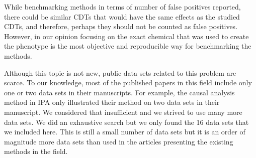 
While benchmarking methods in terms of number of false positives reported, there could be similar CDTs that would have the same effects as the studied CDTs, and therefore, perhaps they should not be counted as false positives. However, in our opinion focusing on the exact chemical that was used to create the phenotype is the most objective and reproducible way for benchmarking the methods.


Although this topic is not new, public data sets related to this problem are scarce. To our knowledge, most of the published papers in this field include only one or two data sets in their manuscripts. For example, the causal analysis method in IPA only illustrated their method on two data sets in their manuscript. We considered that insufficient and we strived to use many more data sets. We did an exhaustive search but we only found the 16 data sets that we included here. This is still a small number of data sets but it is an order of magnitude more data sets than used in the articles presenting the existing methods in the field.

